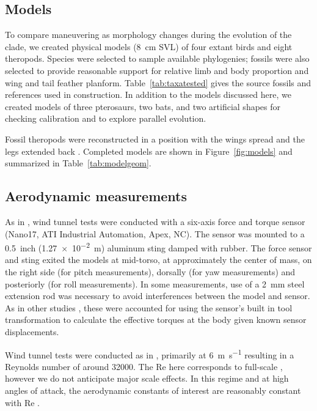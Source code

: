 \subsection{Models}
\label{sec:methods:models}
To compare maneuvering as morphology changes during the evolution of the clade, we created physical models (\SI{8}{\centi\meter} SVL) of four extant birds and eight theropods.  Species were selected to sample available phylogenies; fossils were also selected to provide reasonable support for relative limb and body proportion and wing and tail feather planform. Table~\ref{tab:taxatested} gives the source fossils and references used in construction. In addition to the models discussed here, we created models of three pterosaurs, two bats, and two artificial shapes for checking calibration and to explore parallel evolution.  

Fossil theropods were reconstructed in a position with the wings spread and the legs extended back \cite{Nova}. Completed models are shown in Figure~\ref{fig:models} and summarized in Table~\ref{tab:modelgeom}.

\subsection{Aerodynamic measurements}
\label{sec:methods:measurements}
As in \cite{plos:part1}, wind tunnel tests were conducted with a six-axis force and torque sensor (Nano17, ATI Industrial Automation, Apex, NC).  The sensor was mounted to a \SI{0.5}{inch} (\SI{1.27e-2}{\meter}) aluminum sting damped with rubber. The force sensor and sting exited the models at mid-torso, at approximately the center of mass, on the right side (for pitch measurements), dorsally (for yaw measurements) and posteriorly (for roll measurements).  In some measurements, use of a \SI{2}{\milli\meter} steel extension rod was necessary to avoid interferences between the model and sensor.  As in other studies \cite{Munk:2011}, these were accounted for using the sensor's built in tool transformation to calculate the effective torques at the body given known sensor displacements. 

Wind tunnel tests were conducted as in \cite{plos:part1}, primarily at \SI{6}{\meter\per\second} resulting in a Reynolds number of around \num{32000}.  The $\mbox{Re}$ here corresponds to full-scale \Archaeopteryx, however we do not anticipate major scale effects.  In this regime and at high angles of attack, the aerodynamic constants of interest are reasonably constant with $\mbox{Re}$ \cite{Koehl:2011}. 

